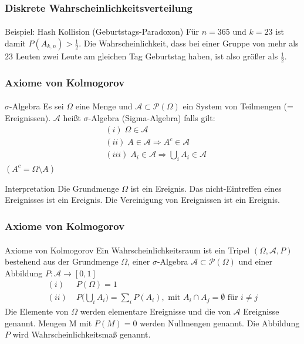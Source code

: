 \documentclass{beamer}
\begin{document}
\begin{frame}
    \frametitle{Diskrete Wahrscheinlichkeitsverteilung}
\framesubtitle{}

\begin{block}{Beispiel: Hash Kollision (Geburtstags-Paradoxon)}
Für $n=365$ und $k=23$ ist damit $ P(A_{k,n} ) > \frac{1}{2}$. Die Wahrscheinlichkeit, dass bei einer Gruppe von mehr als $23$ Leuten zwei Leute am gleichen Tag Geburtstag haben, ist also größer als $ \frac{1}{2}$.
\end{block}



 \end{frame}




\begin{frame}
    \frametitle{Axiome von Kolmogorov}
\framesubtitle{}
\begin{block}{$\sigma$-Algebra}
Es sei $\Omega$ eine Menge und $\mathcal{A} \subset  \mathcal{P}(\Omega)$ ein System von Teilmengen (= Ereignissen). $\mathcal{A}$ heißt $\sigma$-Algebra (Sigma-Algebra) falls gilt:
\begin{align*}
& (i) \; \Omega \in \mathcal{A} \\
& (ii) \; A \in \mathcal{A} \Rightarrow A^c \in \mathcal{A} \\
& (iii) \; A_i \in \mathcal{A} \Rightarrow \bigcup_i A_i \in \mathcal{A} 
\end{align*}
$(A^c = \Omega \setminus A)$
\end{block}

\begin{block}{Interpretation}
Die Grundmenge $\Omega$ ist ein Ereignis. Das nicht-Eintreffen eines Ereignisses ist ein Ereignis. Die Vereinigung von Ereignissen ist ein Ereignis.
\end{block}


 \end{frame}


\begin{frame}
    \frametitle{Axiome von Kolmogorov}
\framesubtitle{}
\begin{block}{Axiome von Kolmogorov}
Ein Wahrscheinlichkeitsraum ist ein Tripel $(\Omega, \mathcal{A}, P)$ bestehend aus der Grundmenge $\Omega$, einer $\sigma$-Algebra $\mathcal{A} \subset  \mathcal{P}(\Omega)$ und einer Abbildung
$P : \mathcal{A} \to [0,1]$
\begin{align*}
(i) & \; P(\Omega) = 1 \\
(ii) & \;  P \biggl(  \bigcup_i A_i  \biggr) = \sum_i P(A_i), \text{ mit } A_i \cap A_j = \emptyset \text{ für } i \neq j
\end{align*}
Die Elemente von $\Omega$ werden elementare Ereignisse und die von $\mathcal{A}$ Ereignisse genannt. Mengen M mit $P(M) = 0$ werden Nullmengen genannt.
Die Abbildung $P$ wird Wahrscheinlichkeitsmaß genannt.
\end{block}


 \end{frame}
\end{document}
